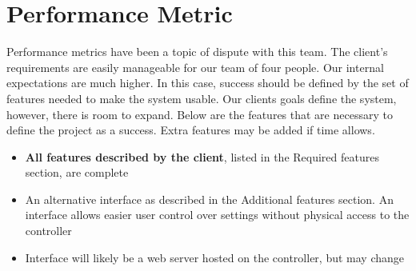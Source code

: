\documentclass[onecolumn, draftclsnofoot,10pt, compsoc]{article}
\begin{document}
\section{Performance Metric}
Performance metrics have been a topic of dispute with this team. The client's requirements are easily manageable for our team of four people. Our internal expectations are much higher. In this case, success should be defined by the set of features needed to make the system usable. Our clients goals define the system, however, there is room to expand. Below are the features that are necessary to define the project as a success. Extra features may be added if time allows.
\begin{itemize}
	\item \textbf{All features described by the client}, listed in the Required features section, are complete
	\item An alternative interface as described in the Additional features section. An interface allows easier user control over settings without physical access to the controller
	\item Interface will likely be a web server hosted on the controller, but may change
\end{itemize}
\end{document}
